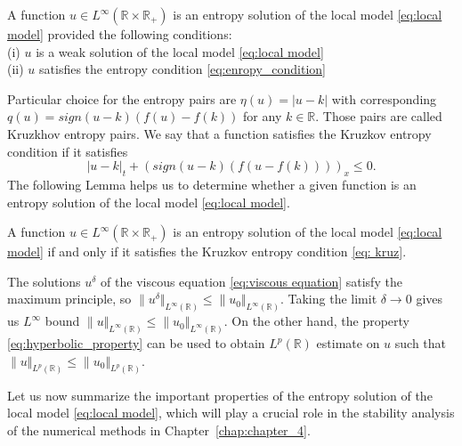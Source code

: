 \begin{definition}
    A function $u \in L^{\infty}(\mathbb{R} \times \mathbb{R_{+}})$ is an entropy solution of the local model \eqref{eq:local model} provided the following conditions: \\
    (i) $u$ is a weak solution of the local model \eqref{eq:local model} \\
    (ii) $u$ satisfies the entropy condition \eqref{eq:enropy_condition}
\end{definition}
Particular choice for the entropy pairs are $\eta(u)= |u-k|$ with corresponding $q(u)= sign(u-k)(f(u)-f(k))$ for any $k \in \mathbb{R}$. Those pairs are called Kruzkhov entropy pairs. We say that a function satisfies the Kruzkov entropy condition if it satisfies
\begin{equation}\label{eq: kruz}
    |u-k|_{t} + (sign(u-k)(f(u-f(k))))_{x} \leq 0.
\end{equation}
The following Lemma helps us to determine whether a given function is an entropy solution of the local model \eqref{eq:local model}.
\begin{lemma}
    A function $ u \in L^{\infty}(\mathbb{R} \times \mathbb{R_{+}})$ is an entropy solution of the local model \eqref{eq:local model} if and only if it satisfies the Kruzkov entropy condition \eqref{eq: kruz}.
\end{lemma}
The solutions $u^{\delta}$ of the viscous equation \eqref{eq:viscous equation} satisfy the maximum principle, so $\| u^{\delta}\Vert_{L^{\infty}(\mathbb{R})} \leq \| u_{0}\Vert_{L^{\infty}(\mathbb{R})}$. Taking the limit $\delta \rightarrow 0$ gives us $L^{\infty}$ bound $\| u \Vert_{L^{\infty}(\mathbb{R})} \leq \| u_{0}\Vert_{L^{\infty}(\mathbb{R})}$. On the other hand, the property \eqref{eq:hyperbolic_property} can be used to obtain ${L^{p}(\mathbb{R})}$ estimate on $u$ such that  $\| u \Vert_{L^{p}(\mathbb{R})} \leq \| u_{0}\Vert_{L^{p}(\mathbb{R})}$.

Let us now summarize the important properties of the entropy solution of the local model \eqref{eq:local model}, which will play a crucial role in the stability analysis of the numerical methods in Chapter~\ref{chap:chapter_4}.


